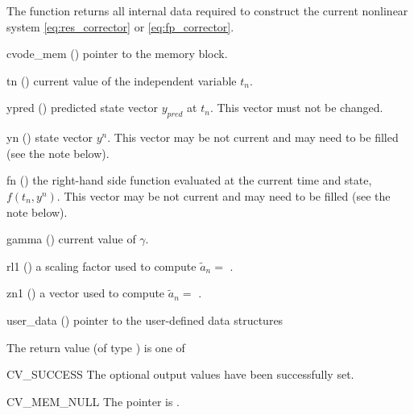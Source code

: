 {
  The function  returns all internal
  data required to construct the current nonlinear system
  \eqref{eq:res_corrector} or \eqref{eq:fp_corrector}.
}
{
  \begin{args}
  \item[cvode\_mem] () pointer to the {\cvodes} memory block.
  \item[tn] () current value of the independent variable $t_n$.
  \item[ypred] () predicted state vector $y_{pred}$ at $t_n$.
    This vector must not be changed.
  \item[yn] () state vector $y^n$. This vector may be
    not current and may need to be filled (see the note below).
  \item[fn] () the right-hand side function evaluated at the
    current time and state, $f(t_n, y^n)$. This vector may be
    not current and may need to be filled (see the note below).
  \item[gamma] () current value of $\gamma$.
  \item[rl1] () a scaling factor used to compute $\tilde{a}_n = $
    .
  \item[zn1] () a vector used to compute $\tilde{a}_n = $
    .
  \item[user\_data] () pointer to the user-defined data structures
  \end{args}
}
{
  The return value  (of type ) is one of
  \begin{args}
  \item[CV\_SUCCESS]
    The optional output values have been successfully set.
  \item[CV\_MEM\_NULL]
    The  pointer is .
  \end{args}
}
